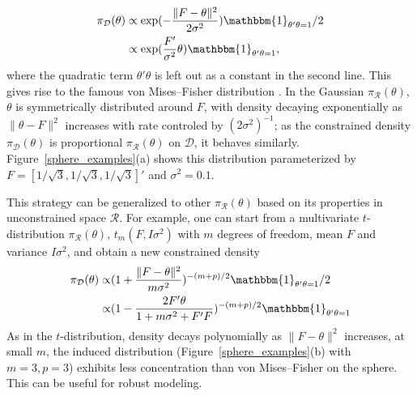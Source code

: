 \documentclass[10pt,fleqn]{article}
\newcommand{\be}{\begin{equation}\begin{aligned}}
\newcommand{\ee}{\end{aligned}\end{equation}}
\newcommand{\mc}[1]{\mathcal{#1}}
\DeclareMathOperator{\No}{No}
\DeclareMathOperator{\1}{\mathbbm{1}}
\begin{document}
\be
\pi_{\mc D}(\theta) &\propto
\exp(-\frac{\|F-\theta\|^2}{2\sigma^2})
\mathbbm{1}_{\theta'\theta=1}/2 \\
& \propto
\exp(\frac{F'}{\sigma^2}\theta)
\mathbbm{1}_{\theta'\theta=1}
,\ee
where the quadratic term $\theta'\theta$ is left out as a constant in the second line. This gives rise to the famous von
Mises--Fisher distribution \citep{khatri1977mises}. In the Gaussian $\pi_{\mc
R}(\theta)$, $\theta$ is symmetrically distributed around $F$, with density
decaying exponentially as $\| \theta-F\|^2$ increases with rate controled by
$({2\sigma^2})^{-1}$; as the constrained
density $\pi_{\mc D}(\theta)$ is proportional $\pi_{\mc R}(\theta)$ on $\mc
D$, it behaves
similarly.  Figure~\ref{sphere_examples}(a) shows this distribution parameterized by $F=[1/\sqrt{3},1/\sqrt{3},1/\sqrt{3}]'$ and $\sigma^2=0.1$.

This strategy can be generalized to  other $\pi_{\mc R}(\theta)$ based on its properties in unconstrained space $\mc R$.
% 
For example, one can start from a
multivariate $t$-distribution $\pi_{\mc
R}(\theta)$, $t_m(F,I\sigma^2)$ with $m$ degrees of freedom,
mean $F$ and variance $I\sigma^2$, and obtain a new constrained density 
\be
\pi_{\mc
D}(\theta)
\propto &
(1+\frac{\|F-\theta\|^2}{m\sigma^2})^{-{(m+p)}/{2}}\mathbbm{1}_{\theta'\theta=1}/2\\
\propto &
(1-\frac{2F'\theta}{1+m\sigma^2+F'F})^{-{(m+p)}/{2}}\mathbbm{1}_{\theta'\theta=1}
\ee
As in the $t$-distribution, density decays polynomially as $\|F-\theta\|^2$ increases, at small
$m$, the induced distribution (Figure~\ref{sphere_examples}(b) with $m=3,p=3$) exhibits less concentration than von
Mises--Fisher on the sphere. This can be useful for robust modeling.
\end{document}
